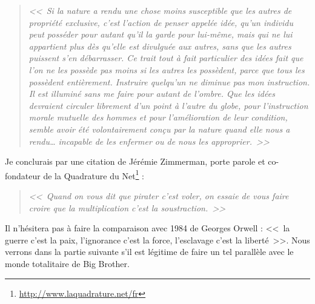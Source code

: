 \begin{quotation}
\textit{<<~Si la nature a rendu une chose moins susceptible que les autres de propriété exclusive, c'est l'action de penser appelée idée, qu'un individu peut posséder pour autant qu'il la garde pour lui-même, mais qui ne lui appartient plus dès qu'elle est divulguée aux autres, sans que les autres puissent s'en débarrasser.
Ce trait tout à fait particulier des idées fait que l'on ne les possède pas moins si les autres les possèdent, parce que tous les possèdent entièrement.
Instruire quelqu'un ne diminue pas mon instruction.
Il est illuminé sans me faire pour autant de l'ombre.
Que les idées devraient circuler librement d'un point à l'autre du globe, pour l'instruction morale mutuelle des hommes et pour l'amélioration de leur condition, semble avoir été volontairement conçu par la nature quand elle nous a rendu\dots{} incapable de les enfermer ou de nous les approprier.~>>}
\end{quotation}

Je conclurais par une citation de Jérémie Zimmerman, porte parole et co-fondateur de la Quadrature du Net\footnote{\url{http://www.laquadrature.net/fr}} :

\begin{quote}
\textit{{\Large <<~Quand on vous dit que pirater c'est voler, on essaie de vous faire croire que la multiplication c'est la soustraction.~>>}}
\end{quote}

Il n'hésitera pas à faire la comparaison avec 1984 de Georges Orwell : <<~la guerre c'est la paix, l'ignorance c'est la force, l'esclavage c'est la liberté~>>.
Nous verrons dans la partie suivante s'il est légitime de faire un tel parallèle avec le monde totalitaire de Big Brother.

